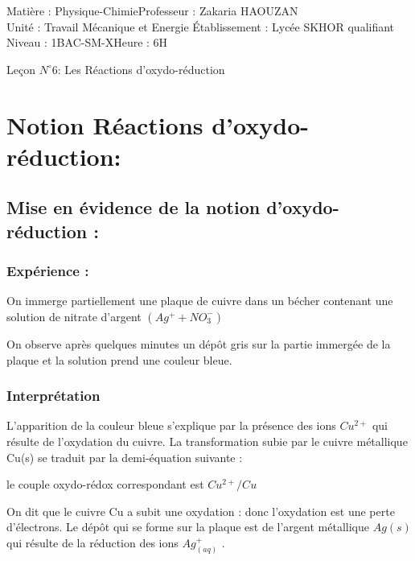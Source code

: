 \documentclass[12pt]{article}
\author{Zakaria HAOUZAN}
\date{\today}
\newcommand\headerMe[2]{\noindent{}#1\hfill#2}
\begin{document}
\headerMe{Matière : Physique-Chimie}{Professeur : Zakaria HAOUZAN}\\
\headerMe{Unité : Travail Mécanique et Energie }{Établissement : Lycée SKHOR qualifiant}\\
\headerMe{Niveau : 1BAC-SM-X}{Heure : 6H}\\

\begin{center}

    \Large{Leçon $N^{\circ} 6 $: \color{red}Les Réactions d’oxydo-réduction}
\end{center}

\section{Notion Réactions d’oxydo-réduction: }
\subsection{Mise en évidence de la notion d’oxydo-réduction :}
\subsubsection{Expérience : }
On immerge partiellement une plaque de cuivre dans un bécher contenant une solution de nitrate d’argent $(Ag^+ + NO_3^-)$

On observe après quelques minutes un dépôt gris sur la partie immergée de la plaque et la solution prend une couleur bleue.

\subsubsection{Interprétation}
L’apparition de la couleur bleue s’explique par la présence des ions $Cu^{2+}$ qui résulte de l’oxydation du cuivre.
La transformation subie par le cuivre métallique Cu(s) se traduit par la demi-équation suivante :

le couple oxydo-rédox correspondant est $Cu^{2+}/Cu$

On dit que le cuivre Cu a subit une oxydation : donc l’oxydation est une perte d’électrons.
Le dépôt qui se forme sur la plaque est de l’argent métallique $Ag(s)$ qui résulte de la réduction des ions $Ag^+_{(aq)}$
.
\end{document}
